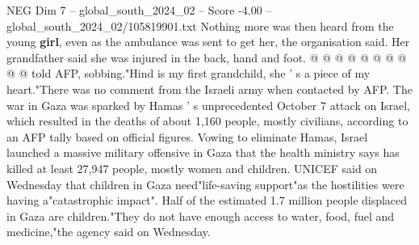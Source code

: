 \begin{textsample}{NEG Dim 7 – global\_south\_2024\_02 – Score -4.00 – global\_south\_2024\_02/105819901.txt}
Nothing more was then heard from the young \textbf{girl}, even as the ambulance was sent to get her, the organisation said.
Her grandfather said she was injured in the back, hand and foot. @ @ @ @ @ @ @ @ @ @ told AFP, sobbing."Hind is my first grandchild, she ' s a piece of my heart."There was no comment from the Israeli army when contacted by AFP.
The war in Gaza was sparked by Hamas ' s unprecedented October 7 attack on Israel, which resulted in the deaths of about 1,160 people, mostly civilians, according to an AFP tally based on official figures.
Vowing to eliminate Hamas, Israel launched a massive military offensive in Gaza that the health ministry says has killed at least 27,947 people, mostly women and children.
UNICEF said on Wednesday that children in Gaza need"life-saving support"as the hostilities were having a"catastrophic impact".
Half of the estimated 1.7 million people displaced in Gaza are children."They do not have enough access to water, food, fuel and medicine,"the agency said on Wednesday.

\end{textsample}
